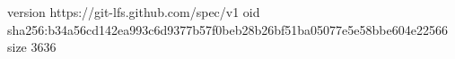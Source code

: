 version https://git-lfs.github.com/spec/v1
oid sha256:b34a56cd142ea993c6d9377b57f0beb28b26bf51ba05077e5e58bbe604e22566
size 3636
